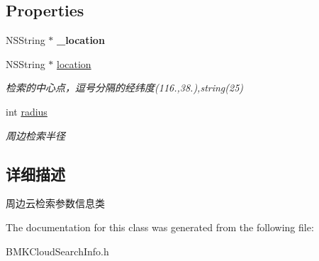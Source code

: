 \subsection*{Properties}
\begin{DoxyCompactItemize}
\item 
\hypertarget{interface_b_m_k_cloud_nearby_search_info_a6a4cfe0d1809afeaa9f9fd78bb29ded3}{N\-S\-String $\ast$ {\bfseries \-\_\-location}}\label{interface_b_m_k_cloud_nearby_search_info_a6a4cfe0d1809afeaa9f9fd78bb29ded3}

\item 
\hypertarget{interface_b_m_k_cloud_nearby_search_info_ae129357a1f589b69f9a2f8ca3613f015}{N\-S\-String $\ast$ \hyperlink{interface_b_m_k_cloud_nearby_search_info_ae129357a1f589b69f9a2f8ca3613f015}{location}}\label{interface_b_m_k_cloud_nearby_search_info_ae129357a1f589b69f9a2f8ca3613f015}

\begin{DoxyCompactList}\small\item\em 检索的中心点，逗号分隔的经纬度(116.,38.),string(25) \end{DoxyCompactList}\item 
\hypertarget{interface_b_m_k_cloud_nearby_search_info_af736625a3a921ec13dd0c8a6deb1c52f}{int \hyperlink{interface_b_m_k_cloud_nearby_search_info_af736625a3a921ec13dd0c8a6deb1c52f}{radius}}\label{interface_b_m_k_cloud_nearby_search_info_af736625a3a921ec13dd0c8a6deb1c52f}

\begin{DoxyCompactList}\small\item\em 周边检索半径 \end{DoxyCompactList}\end{DoxyCompactItemize}


\subsection{详细描述}
周边云检索参数信息类 

The documentation for this class was generated from the following file\-:\begin{DoxyCompactItemize}
\item 
B\-M\-K\-Cloud\-Search\-Info.\-h\end{DoxyCompactItemize}
